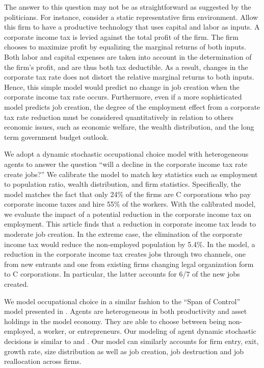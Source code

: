 \documentclass[12pt]{article}
\begin{document}
The answer to this question may not be as straightforward as suggested by
the politicians. For instance, consider a static representative firm
environment. Allow this firm to have a productive technology that uses
capital and labor as inputs. A corporate income tax is levied against the
total profit of the firm. The firm chooses to maximize profit by equalizing
the marginal returns of both inputs. Both labor and capital expenses are
taken into account in the determination of the firm's profit, and are thus
both tax deductible. As a result, changes in the corporate tax rate does not
distort the relative marginal returns to both inputs. Hence, this simple
model would predict no change in job creation when the corporate income tax
rate occurs. Furthermore, even if a more sophisticated model predicts job
creation, the degree of the employment effect from a corporate tax rate reduction must
be considered quantitatively in relation to others economic issues, such as economic welfare, the wealth distribution, and the long term government budget outlook.

We adopt a dynamic stochastic occupational choice model with heterogeneous agents to answer the question ``will a decline in the corporate income tax rate create jobs?'' We calibrate the model to match key statistics such as employment to population ratio, wealth distribution, and firm statistics. Specifically, the model matches the fact that only 24\% of the firms are C corporations who pay corporate income taxes and hire 55\% of the workers. With the calibrated model, we evaluate the impact of a potential reduction in the corporate income tax on employment. This article finds that a reduction in corporate income tax leads to moderate job creation. In the extreme case, the elimination of the corporate income tax would reduce the non-employed population by 5.4\%. In the model, a reduction in the corporate income tax creates jobs through two channels, one from new entrants and one from existing firms changing legal organization form to C corporations. In particular, the latter accounts for 6/7 of the new jobs created.

We model occupational choice in a similar fashion to the ``Span of Control'' model presented in \citet{LucasSpan}. Agents are heterogeneous in both productivity and asset holdings in the model economy. They are able to choose between being non-employed, a worker, or entrepreneurs. Our modeling of agent dynamic stochastic decisions is similar to \citet{Hopenhayn1992} and \citet{Hopenhayn1993}. Our model can similarly accounts for firm entry, exit, growth rate, size distribution as well as job creation, job destruction and job reallocation across firms.
\end{document}
